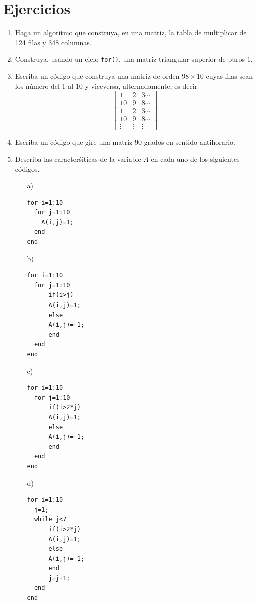 \documentclass[11pt,legalpaper]{article}
\begin{document}
\section{Ejercicios}
  \begin{enumerate}
  	\item Haga un algoritmo que construya, en una matriz, la tabla de multiplicar de 124 filas y 348 columnas.
    \item Construya, usando un ciclo \texttt{for()}, una matriz triangular superior de puros $1$.
   \item Escriba un c\'odigo que construya una matriz de orden $98\times 10$ cuyas filas sean los n\'umero del 1 al 10 y viceversa, alternadamente, es 
   decir
	$$
	\left [
	     \begin{array}{ccc}
	      1 & 2 & 3 \cdots  \\
	      10 & 9 & 8 \cdots \\
     	      1 & 2 & 3 \cdots  \\
	      10 & 9 & 8 \cdots \\
	      \vdots & \vdots & \vdots
	     \end{array}
	\right]
	$$
  \item Escriba un c\'odigo que gire una matriz 90 grados en sentido antihorario.
  
  \item Describa las caracter\'siticas de la variable $A$ en cada uno de los siguientes c\'odigos.
	\begin{multicols}{2}
    \begin{itemize}
     \item[a)] 
\begin{verbatim}
for i=1:10
  for j=1:10
    A(i,j)=1;
  end
end
\end{verbatim}
      \item[b)] 
\begin{verbatim}
for i=1:10
  for j=1:10
      if(i>j)
      A(i,j)=1;
      else
      A(i,j)=-1;
      end
  end
end
\end{verbatim}
      \item[c)] 
\begin{verbatim}
for i=1:10
  for j=1:10
      if(i>2*j)
      A(i,j)=1;
      else
      A(i,j)=-1;
      end
  end
end
\end{verbatim}

   \item[d)] 
\begin{verbatim}
for i=1:10
  j=1;
  while j<7
      if(i>2*j)
      A(i,j)=1;
      else
      A(i,j)=-1;
      end
      j=j+1;
  end
end
\end{verbatim}


\end{itemize}
\end{multicols}
\end{enumerate}
\end{document}
